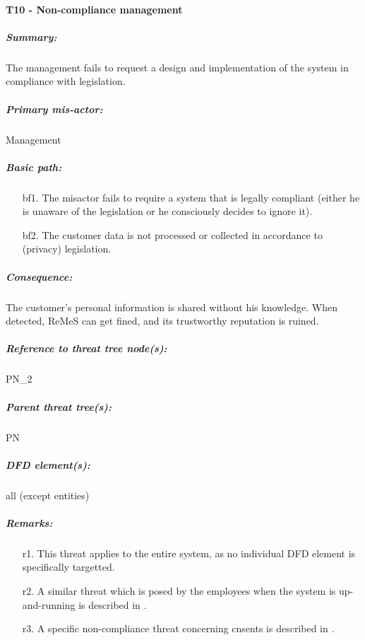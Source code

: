 

\paragraph{T10 - Non-compliance management}
\label{par:t11}
    \subparagraph{Summary:} The management fails to request a design and implementation of the system in
compliance with legislation.
    \subparagraph{Primary mis-actor:} Management
    \subparagraph{Basic path:}
    \begin{enumerate}
        \item[bf1.] The misactor fails to require a system that is legally compliant (either he is unaware of the
legislation or he consciously decides to ignore it).
        \item[bf2.] The customer data is not processed or collected in accordance to (privacy) legislation.
    \end{enumerate}
    \subparagraph{Consequence:} The customer's personal information is shared without his knowledge. When
detected, ReMeS can get fined, and its trustworthy reputation is ruined.


    \subparagraph{Reference to threat tree node(s):} PN\_2
    \subparagraph{Parent threat tree(s):} PN
    \subparagraph{DFD element(s):} all (except entities)
    \subparagraph{Remarks:}
    \begin{enumerate}
        \item[r1.] This threat applies to the entire system, as no individual DFD element is specifically targetted.
        \item[r2.] A similar threat which is posed by the employees when the system is up-and-running is
described in .
		\item[r3.] A specific non-compliance threat concerning cnsents is described in .
    \end{enumerate}



